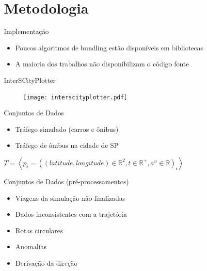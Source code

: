 \section{Metodologia}

\begin{frame}{Implementação}
  \begin{itemize}
    \item Poucos algoritmos de bundling estão disponíveis em bibliotecas
    \item A maioria dos trabalhos não disponibilizam o código fonte
  \end{itemize}
\end{frame}

{
\begin{frame}{InterSCityPlotter}
  \begin{figure}[!htb]
    \centering
    \texttt{[image: interscityplotter.pdf]}
  \end{figure}
\end{frame}
}


\begin{frame}{Conjuntos de Dados}
  \begin{itemize}
    \item Tráfego simulado (carros e ônibus)
    \item Tráfego de ônibus na cidade de SP
  \end{itemize}

  \begin{center}
  $T = \left\langle p_i = ((latitude, longitude) \in \mathbb{R}^2, t \in \mathbb{R}^+, a^n \in \mathbb{R})_i \right\rangle$
  \end{center}
\end{frame}

\begin{frame}{Conjuntos de Dados (pré-processamentos)}
  \begin{itemize}
    \item Viagens da simulação não finalizadas
    \item Dados inconsistentes com a trajetória
    \item Rotas circulares
    \item Anomalias
    \item Derivação da direção
  \end{itemize}
\end{frame}

